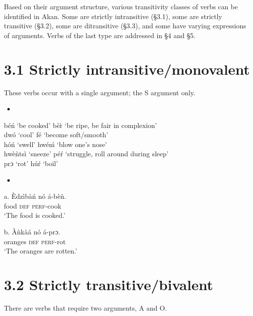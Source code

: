 \documentclass[output=paper]{langsci/langscibook}
\begin{document}
Based on their argument structure, various transitivity classes of verbs can be identified in Akan. Some are strictly intransitive (§3.1), some are strictly transitive (§3.2), some are ditransitive (§3.3), and some have varying expressions of arguments. Verbs of the last type are addressed in §4 and §5.

\section{3.1  Strictly intransitive/monovalent}

These verbs occur with a single argument; the S argument only.

\begin{itemize}
\item \end{itemize}
\gll \textup{  }b\'{e}\'{n}   \textup{‘be cooked’}     b\`{e}\`{r}   \textup{‘be ripe, be fair in complexion’}   \\
\gll dw\'{o}   \textup{‘cool’ }      f\'{e}   \textup{‘become soft/smooth’}  \\
\gll h\'{o}\'{n}   \textup{‘swell’}     hw\'{e}\'{m}   \textup{‘blow one’s nose’} \\
\gll hw\`{e}\`{n}ts\`{i}   \textup{‘sneeze’}     p\'{e}\'{r}   \textup{‘struggle, roll around during sleep’}\\
\gll prɔ   \textup{‘rot’}       h\'{u}\'{r}   \textup{‘boil’} \\
\begin{itemize}
\item \end{itemize}
\gll a.  \`{E}dz\`{i}b\`{a}\'{n}  n\'{o}  \'{a}-b\`{e}\`{n}.\\
       food    \textsc{def}  \textsc{perf}{}-cook\\
\glt   ‘The food is cooked.’
\z

\gll  b.  \`{A}\`{n}k\`{a}\'{a}    n\'{o}  \'{a}-prɔ.\\
       oranges  \textsc{def}  \textsc{perf}{}-rot\\
\glt   ‘The oranges are rotten.’
\z

\section{3.2  Strictly transitive/bivalent}

There are verbs that require two arguments, A and O.
\end{document}
